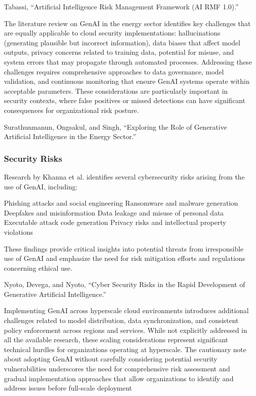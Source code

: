 Tabassi, “Artificial Intelligence Risk Management Framework (AI RMF 1.0).”

The literature review on GenAI in the energy sector identifies key challenges that are equally applicable to cloud security implementations: hallucinations (generating plausible but incorrect information), data biases that affect model outputs, privacy concerns related to training data, potential for misuse, and system errors that may propagate through automated processes.
Addressing these challenges requires comprehensive approaches to data governance, model validation, and continuous monitoring that ensure GenAI systems operate within acceptable parameters. These considerations are particularly important in security contexts, where false positives or missed detections can have significant consequences for organizational risk posture.

Surathunmanun, Ongsakul, and Singh, “Exploring the Role of Generative Artificial Intelligence in the Energy Sector.”


\subsubsection{Security Risks} %
\label{sec:Security Risks}

Research by Khanna et al. identifies several cybersecurity risks arising from the use of GenAI, including:

Phishing attacks and social engineering
Ransomware and malware generation
Deepfakes and misinformation
Data leakage and misuse of personal data
Executable attack code generation
Privacy risks and intellectual property violations

These findings provide critical insights into potential threats from irresponsible use of GenAI and emphasize the need for risk mitigation efforts and regulations concerning ethical use.

Nyoto, Devega, and Nyoto, “Cyber Security Risks in the Rapid Development of Generative Artificial Intelligence.”

Implementing GenAI across hyperscale cloud environments introduces additional challenges related to model distribution, data synchronization, and consistent policy enforcement across regions and services. While not explicitly addressed in all the available research, these scaling considerations represent significant technical hurdles for organizations operating at hyperscale.
The cautionary note about adopting GenAI without carefully considering potential security vulnerabilities underscores the need for comprehensive risk assessment and gradual implementation approaches that allow organizations to identify and address issues before full-scale deployment

